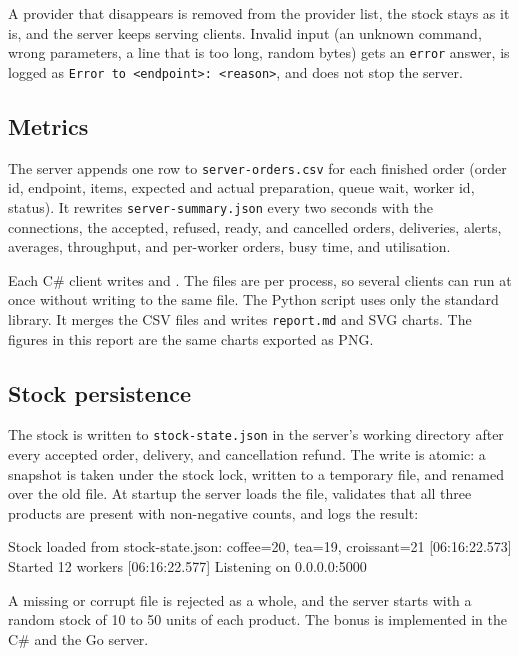 \documentclass[12pt,a4paper]{article}
\begin{document}
A provider that disappears is removed from the provider list, the stock stays as
it is, and the server keeps serving clients. Invalid input (an unknown command,
wrong parameters, a line that is too long, random bytes) gets an \texttt{error}
answer, is logged as \texttt{Error to <endpoint>: <reason>}, and does not stop the
server.

\subsection{Metrics}

The server appends one row to \texttt{server-orders.csv} for each finished order
(order id, endpoint, items, expected and actual preparation, queue wait, worker
id, status). It rewrites \texttt{server-summary.json} every two seconds with the
connections, the accepted, refused, ready, and cancelled orders, deliveries,
alerts, averages, throughput, and per-worker orders, busy time, and utilisation.

Each C\# client writes  and
. The files are per process, so several clients
can run at once without writing to the same file. The Python script
 uses only the standard library. It merges
the CSV files and writes \texttt{report.md} and SVG charts. The figures in this
report are the same charts exported as PNG.

\subsection{Stock persistence}

The stock is written to \texttt{stock-state.json} in the server's working
directory after every accepted order, delivery, and cancellation refund. The write
is atomic: a snapshot is taken under the stock lock, written to a temporary file,
and renamed over the old file. At startup the server loads the file, validates
that all three products are present with non-negative counts, and logs the result:

\begin{terminalwindow}[]
[06:16:22.563] Stock loaded from stock-state.json: coffee=20, tea=19, croissant=21
[06:16:22.573] Started 12 workers
[06:16:22.577] Listening on 0.0.0.0:5000
\end{terminalwindow}

A missing or corrupt file is rejected as a whole, and the server starts with a
random stock of 10 to 50 units of each product. The bonus is implemented in the C\#
and the Go server.
\end{document}
